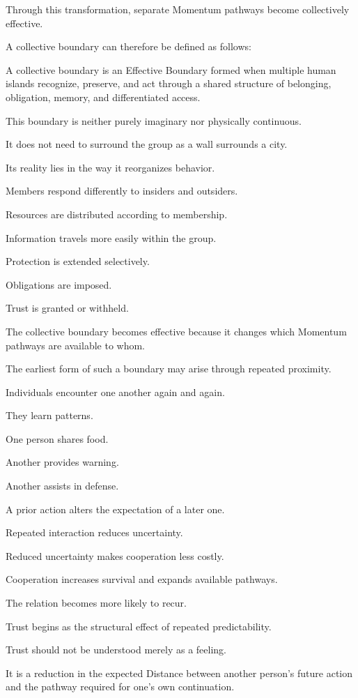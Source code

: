 Through this transformation, separate Momentum pathways become collectively effective.

A collective boundary can therefore be defined as follows:

A collective boundary is an Effective Boundary formed when multiple human islands recognize, preserve, and act through a shared structure of belonging, obligation, memory, and differentiated access.

This boundary is neither purely imaginary nor physically continuous.

It does not need to surround the group as a wall surrounds a city.

Its reality lies in the way it reorganizes behavior.

Members respond differently to insiders and outsiders.

Resources are distributed according to membership.

Information travels more easily within the group.

Protection is extended selectively.

Obligations are imposed.

Trust is granted or withheld.

The collective boundary becomes effective because it changes which Momentum pathways are available to whom.

The earliest form of such a boundary may arise through repeated proximity.

Individuals encounter one another again and again.

They learn patterns.

One person shares food.

Another provides warning.

Another assists in defense.

A prior action alters the expectation of a later one.

Repeated interaction reduces uncertainty.

Reduced uncertainty makes cooperation less costly.

Cooperation increases survival and expands available pathways.

The relation becomes more likely to recur.

Trust begins as the structural effect of repeated predictability.

Trust should not be understood merely as a feeling.

It is a reduction in the expected Distance between another person’s future action and the pathway required for one’s own continuation.

